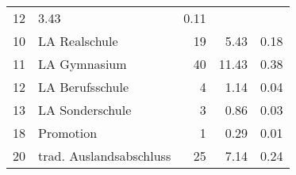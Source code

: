 \begin{longtable}{lXrrr}
       \num{12} &
       \num[round-mode=places,round-precision=2]{3,43} &
         \num[round-mode=places,round-precision=2]{0,11} \\

     10 &
     \multicolumn{1}{X}{ LA Realschule   } &


       \num{19} &
       \num[round-mode=places,round-precision=2]{5,43} &
         \num[round-mode=places,round-precision=2]{0,18} \\

     11 &
     \multicolumn{1}{X}{ LA Gymnasium   } &


       \num{40} &
       \num[round-mode=places,round-precision=2]{11,43} &
         \num[round-mode=places,round-precision=2]{0,38} \\

     12 &
     \multicolumn{1}{X}{ LA Berufsschule   } &


       \num{4} &
       \num[round-mode=places,round-precision=2]{1,14} &
         \num[round-mode=places,round-precision=2]{0,04} \\

     13 &
     \multicolumn{1}{X}{ LA Sonderschule   } &


       \num{3} &
       \num[round-mode=places,round-precision=2]{0,86} &
         \num[round-mode=places,round-precision=2]{0,03} \\

     18 &
     \multicolumn{1}{X}{ Promotion   } &


       \num{1} &
       \num[round-mode=places,round-precision=2]{0,29} &
         \num[round-mode=places,round-precision=2]{0,01} \\

     20 &
     \multicolumn{1}{X}{ trad. Auslandsabschluss   } &


       \num{25} &
       \num[round-mode=places,round-precision=2]{7,14} &
         \num[round-mode=places,round-precision=2]{0,24} \\


\end{longtable}
